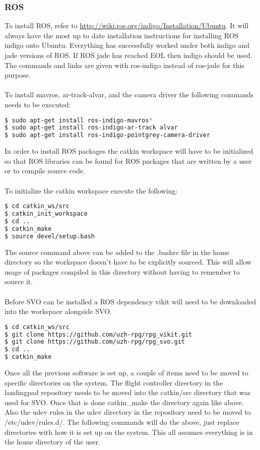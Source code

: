 \subsubsection{ROS}
To install ROS, refer to \url{http://wiki.ros.org/indigo/Installation/Ubuntu}. It will always have the most up to date installation instructions for installing ROS indigo onto Ubuntu. Everything has successfully worked under both indigo and jade versions of ROS. If ROS jade has reached EOL then indigo should be used. The commands and links are given with ros-indigo instead of ros-jade for this purpose.\\
\\ 
To install mavros, ar-track-alvar, and the camera driver the following commands needs to be executed:
\begin{lstlisting}[language=bash]
$ sudo apt-get install ros-indigo-mavros*
$ sudo apt-get install ros-indigo-ar-track alvar
$ sudo apt-get install ros-indigo-pointgrey-camera-driver
\end{lstlisting}
In order to install ROS packages the catkin workspace will have to be initialized so that ROS libraries can be found for ROS packages that are written by a user or to compile source code. \\
\\
To initialize the catkin workspace execute the following:
\begin{lstlisting}[language=bash]
$ cd catkin_ws/src
$ catkin_init_workspace
$ cd ..
$ catkin_make
$ source devel/setup.bash
\end{lstlisting}
The source command above can be added to the .bashrc file in the home directory so the workspace doesn't have to be explicitly sourced. This will allow usage of packages compiled in this directory without having to remember to source it. \\
\\
Before SVO can be installed a ROS dependency vikit will need to be downloaded into the workspace alongside SVO.
\begin{lstlisting}[language=bash]
$ cd catkin_ws/src
$ git clone https://github.com/uzh-rpg/rpg_vikit.git
$ git clone https://github.com/uzh-rpg/rpg_svo.git
$ cd ..
$ catkin_make
\end{lstlisting}
Once all the previous software is set up, a couple of items need to be moved to specific directories on the system. The flight controller directory in the landingpad repository needs to be moved into the catkin/src directory that was used for SVO. Once that is done catkin\_make the directory again like above. Also the udev rules in the udev directory in the repository need to be moved to /etc/udev/rules.d/. The following commands will do the above, just replace directories with how it is set up on the system. This all assumes everything is in the home directory of the user. 
